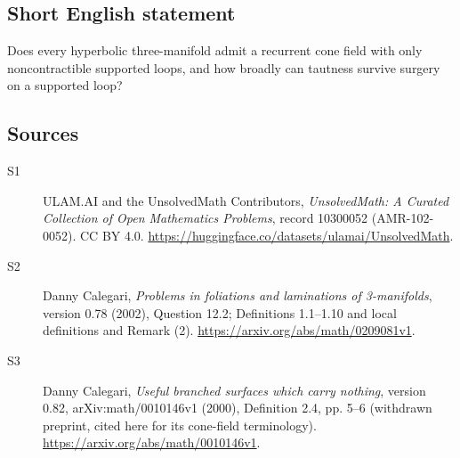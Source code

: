 \documentclass[11pt]{article}
\begin{document}
\subsection{Short English statement}
Does every hyperbolic three-manifold admit a recurrent cone field with only noncontractible supported loops, and how broadly can tautness survive surgery on a supported loop?
\subsection{Sources}
\begin{description}
\item[\hypertarget{source:10300052:1}{S1}] ULAM.AI and the UnsolvedMath Contributors, \emph{UnsolvedMath: A Curated Collection of Open Mathematics Problems}, record 10300052 (AMR-102-0052). CC BY 4.0. \url{https://huggingface.co/datasets/ulamai/UnsolvedMath}.
\item[\hypertarget{source:10300052:2}{S2}] Danny Calegari, \emph{Problems in foliations and laminations of 3-manifolds}, version 0.78 (2002), Question 12.2; Definitions 1.1--1.10 and local definitions and Remark (2). \url{https://arxiv.org/abs/math/0209081v1}.
\item[\hypertarget{source:10300052:3}{S3}] Danny Calegari, \emph{Useful branched surfaces which carry nothing}, version 0.82, arXiv:math/0010146v1 (2000), Definition 2.4, pp. 5--6 (withdrawn preprint, cited here for its cone-field terminology). \url{https://arxiv.org/abs/math/0010146v1}.
\end{description}
\label{end:10300052}
\end{document}
